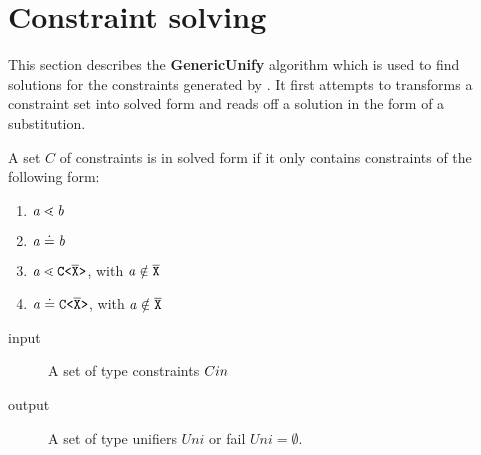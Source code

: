 \clearpage
\section{Constraint solving}
\label{sec:unify}

This section describes the \textbf{GenericUnify} algorithm
which is used to find solutions for the constraints generated by \fjtype.
It first attempts to transforms a constraint set into solved form and
reads off a solution in the form of a substitution.

  
\begin{definition}\label{def:solved-form}
  A set $C$ of constraints is in solved form if it only contains
  constraints of the following form:
  \begin{enumerate}
  \item $\mathit{ a } \lessdot \mathit{ b }$ %
  \item $\mathit{ a } \doteq \mathit{ b }$
  \item $\mathit{ a } \lessdot \mathtt{C \texttt{<} \overline{\tt X} \texttt{>} }$, with $\mathit{ a } \notin \overline{\tt X}$ %
  \item $\mathit{ a } \doteq \mathtt{C \texttt{<} \overline{\tt X} \texttt{>} }$, with $\mathit{ a } \notin \overline{\tt X}$
  \end{enumerate}
\end{definition}  
  
\begin{description}
\item[input] A set of type constraints $C{in}$ %
\item[output] A set of type unifiers $Uni$
or fail $Uni = \emptyset$.
\end{description}


